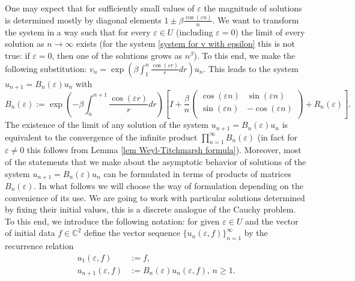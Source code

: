 \documentclass[a4paper,oneside,12pt]{amsart}
\begin{document}
One may expect that for sufficiently small values of $\varepsilon$ the magnitude of solutions is determined mostly by diagonal elements $1\pm\beta\frac{\cos(\varepsilon n)}n$. We want to transform the system in a way such that for every $\varepsilon\in U$ (including $\varepsilon=0$) the limit of every solution as $n\rightarrow\infty$ exists (for the system \eqref{system for v with epsilon} this is not true: if $\varepsilon=0$, then one of the solutions grows as $n^{\beta}$). To this end, we make the following substitution: $v_n=\exp\left(\beta\int_1^n\frac{\cos(\varepsilon r)}rdr\right)u_n$. This leads to the system $u_{n+1}=B_n(\varepsilon)u_n$ with
\begin{equation}\label{B-n}
    B_n(\varepsilon):=\exp\left(-\beta\int_n^{n+1}\frac{\cos(\varepsilon r)}rdr\right)
    \left[
    I+\frac{\beta}n
    \left(    \begin{array}{cc}
    \cos(\varepsilon n) & \sin(\varepsilon n) \\
    \sin(\varepsilon n) & -\cos(\varepsilon n) \\
    \end{array}    \right)
    +R_n(\varepsilon)
    \right].
\end{equation}
The existence of the limit of any solution of the system $u_{n+1}=B_n(\varepsilon)u_n$ is equivalent to the convergence of the infinite product $\prod_{n=1}^{\infty}B_n(\varepsilon)$ (in fact for $\varepsilon\neq0$ this follows from Lemma \ref{lem Weyl-Titchmarsh formula}). Moreover, most of the statements that we make about the asymptotic behavior of solutions of the system $u_{n+1}=B_n(\varepsilon)u_n$ can be formulated in terms of products of matrices $B_n(\varepsilon)$. In what follows we will choose the way of formulation depending on the convenience of its use. We are going to work with particular solutions determined by fixing their initial values, this is a discrete analogue of the Cauchy problem. To this end, we introduce the following notation: for given $\varepsilon\in U$ and the vector of initial data $f\in\mathbb C^2$ define the vector sequence $\{u_n(\varepsilon,f)\}_{n=1}^{\infty}$ by the recurrence relation
\begin{equation}\label{u(f)}
    \begin{array}{rl}
    u_1(\varepsilon,f) & :=f,
    \\
    u_{n+1}(\varepsilon,f) & :=B_n(\varepsilon)u_n(\varepsilon,f),\,n\ge1.
    \end{array}
\end{equation}
\end{document}
